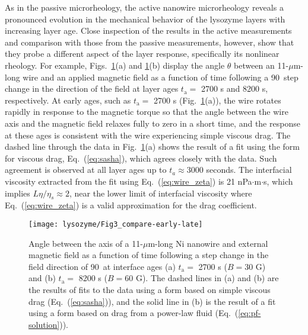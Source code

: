 As in the passive microrheology, the active nanowire microrheology reveals a pronounced evolution in the mechanical behavior of the lysozyme layers with increasing layer age.  Close inspection of the results in the active measurements and comparison with those from the passive measurements, however, show that they probe a different aspect of the layer response, specifically its nonlinear rheology.  For example, Figs.~\ref{fig:early-and-late-rotation}(a) and \ref{fig:early-and-late-rotation}(b) display the angle $\theta$ between an 11-$\mu$m-long wire and an applied magnetic field as a function of time following a 90\degree\ step change in the direction of the field at layer ages $t_{\text{a}}=$ 2700 s and 8200 s, respectively.  At early ages, such as $t_{\text{a}}=$ 2700 s (Fig.~\ref{fig:early-and-late-rotation}(a)), the wire rotates rapidly in response to the magnetic torque so that the angle between the wire axis and the magnetic field relaxes fully to zero in a short time, and the response at these ages is consistent with the wire experiencing simple viscous drag.  The dashed line through the data in Fig.~\ref{fig:early-and-late-rotation}(a) shows the result of a fit using the form for viscous drag, Eq.~(\ref{eq:sasha}), which agrees closely with the data.  Such agreement is observed at all layer ages up to $t_a \approx 3000$ seconds.  The interfacial viscosity extracted from the fit using Eq.~(\ref{eq:wire_zeta}) is 21 nPa$\cdot$m$\cdot$s, which implies $L\eta/\eta_s \approx 2$, near the lower limit of interfacial viscosity where Eq.~(\ref{eq:wire_zeta}) is a valid approximation for the drag coefficient. 

\begin{figure}
  \texttt{[image: lysozyme/Fig3\_compare-early-late]}
 \caption{\label{fig:early-and-late-rotation} Angle between the axis of a 11-$\mu$m-long Ni nanowire and external magnetic field as a function of time following a step change in the field direction of 90\degree~at interface ages (a) $t_{\text{a}}=$ 2700 s ($B = 30$ G) and (b) $t_{\text{a}}=$ 8200 s ($B = 60$ G).  The dashed lines in (a) and (b) are the results of fits to the data using a form based on simple viscous drag (Eq.~(\ref{eq:sasha})), and the solid line in (b) is the result of a fit using a form based on drag from a power-law fluid (Eq.~(\ref{eq:pf-solution})).}
\end{figure}

